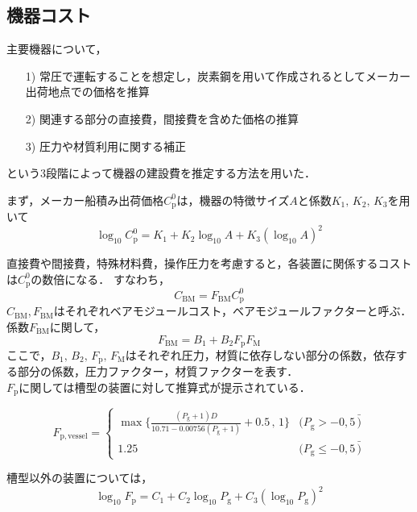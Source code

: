 \documentclass[a4j]{jsreport}
\begin{document}
\subsection{機器コスト}
主要機器について，
\begin{itemize}
    \item[1)]常圧で運転することを想定し，炭素鋼を用いて作成されるとしてメーカー出荷地点での価格を推算
    \item[2)]関連する部分の直接費，間接費を含めた価格の推算
    \item[3)]圧力や材質利用に関する補正
\end{itemize}
という3段階によって機器の建設費を推定する方法を用いた．
\par
まず，メーカー船積み出荷価格$C_\mathrm{p}^0$は，機器の特徴サイズ$A$と係数$K_1,\,K_2,\,K_3$を用いて
\begin{equation}
    \log_{10}C_\mathrm{p}^0 = K_1 + K_2\log_{10} A + K_3(\log_{10} A)^2
\end{equation}
\par
直接費や間接費，特殊材料費，操作圧力を考慮すると，各装置に関係するコストは$C_\mathrm{p}^0$の数倍になる．
すなわち，
\begin{equation}
    C_\mathrm{BM} = F_\mathrm{BM} C_\mathrm{p}^0
\end{equation}
$C_\mathrm{BM}$,\,$ F_\mathrm{BM}$はそれぞれベアモジュールコスト，ベアモジュールファクターと呼ぶ．
係数$F_\mathrm{BM}$に関して，
\begin{equation}
    F_\mathrm{BM} = B_1 + B_2 F_\mathrm{p} F_\mathrm{M}
\end{equation}
ここで，$B_1,\, B_2 ,\,F_\mathrm{p},\, F_\mathrm{M}$はそれぞれ圧力，材質に依存しない部分の係数，依存する部分の係数，圧力ファクター，材質ファクターを表す．\\
$F_\mathrm{p}$に関しては槽型の装置に対して推算式が提示されている．\\
\begin{center}
\begin{equation}
    F_\mathrm{p,vessel} =
        \begin{cases}
            \max\{\frac{(P_\mathrm{g}+1)D}{10.71-0.00756(P_\mathrm{g}+1)}+0.5 \,,\, 1\} & (P_\mathrm{g} > -0,5\, \bar) \\
            1.25 & (P_\mathrm{g} \leq -0,5\, \bar)
        \end{cases}
\end{equation}
\end{center}
槽型以外の装置については，
\begin{equation}
    \log_{10}F_\mathrm{p} = C_1 + C_2\log_{10} P_\mathrm{g} + C_3(\log_{10} P_\mathrm{g})^2
\end{equation}
\end{document}
